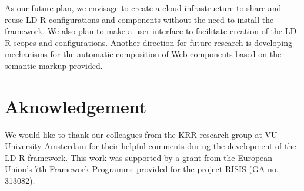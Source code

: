 \documentclass{acm_proc_article-sp}
\begin{document}
As our future plan, we envisage to create a cloud infrastructure to share and reuse LD-R configurations and components without the need to install the framework.
We also plan to make a user interface to facilitate creation of the LD-R scopes and configurations.
Another direction for future research is developing mechanisms for the automatic composition of Web components based on the semantic markup provided.

\section{Aknowledgement}
We would like to thank our colleagues from the KRR research group at VU University Amsterdam for their helpful comments during the development of the LD-R framework. This work was supported by a grant from the European Union's 7th Framework Programme provided for the project RISIS (GA no. 313082).

\clearpage



\end{document}
